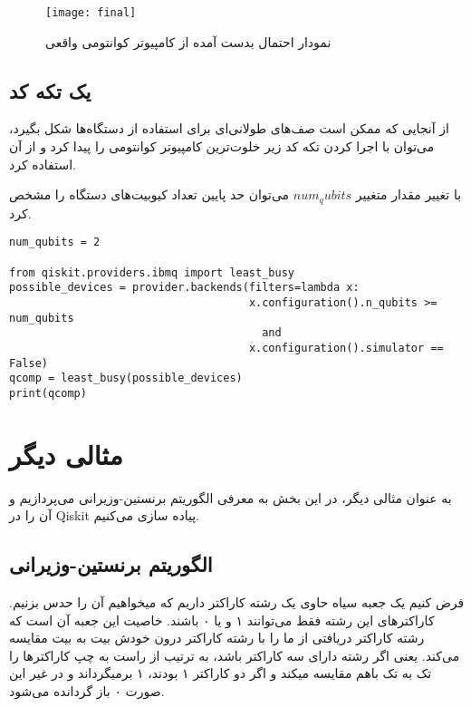 \documentclass[a4paper,11pt,oneside,openany]{iut-thesis}
\begin{document}
\begin{figure}[h]
	\centering
	\texttt{[image: final]}
	\caption{
	نمودار احتمال بدست آمده از کامپیوتر کوانتومی واقعی
	}
	\label{final}
\end{figure}
\newpage


\subsection{
یک تکه کد
}
از آنجایی که ممکن است صف‌های طولانی‌ای برای استفاده از دستگاه‌ها شکل بگیرد،‌ می‌توان با اجرا کردن تکه کد زیر خلوت‌ترین کامپیوتر کوانتومی را پیدا کرد و از آن استفاده کرد.

با تغییر مقدار متغییر $num_qubits$ می‌توان حد پایین تعداد کیوبیت‌های دستگاه را مشخص کرد.
\begin{latin}
\begin{lstlisting}[style=Mypython]
num_qubits = 2

from qiskit.providers.ibmq import least_busy
possible_devices = provider.backends(filters=lambda x: 
                                     x.configuration().n_qubits >= num_qubits
                                       and 
                                     x.configuration().simulator == False)
qcomp = least_busy(possible_devices)
print(qcomp)
\end{lstlisting}
\end{latin}

\section{
مثالی دیگر
}
به عنوان مثالی دیگر، در این بخش به معرفی الگوریتم برنستین-وزیرانی می‌پردازیم و آن را در Qiskit پیاده سازی می‌کنیم.
\subsection{
الگوریتم برنستین-وزیرانی
}

فرض کنیم یک جعبه سیاه حاوی یک رشته کاراکتر داریم که میخواهیم آن را حدس بزنیم. کاراکترهای این رشته فقط می‌توانند ۱ و یا ۰ باشند. خاصیت این جعبه آن است که رشته کاراکتر دریافتی از ما را با رشته کاراکتر درون خودش بیت به بیت مقایسه می‌کند. یعنی اگر رشته دارای سه کاراکتر باشد، به ترتیب از راست به چپ کاراکترها را تک به تک باهم مقایسه میکند و اگر دو کاراکتر ۱ بودند، ۱ برمیگرداند و در غیر این صورت ۰ باز گردانده می‌شود.
\end{document}
